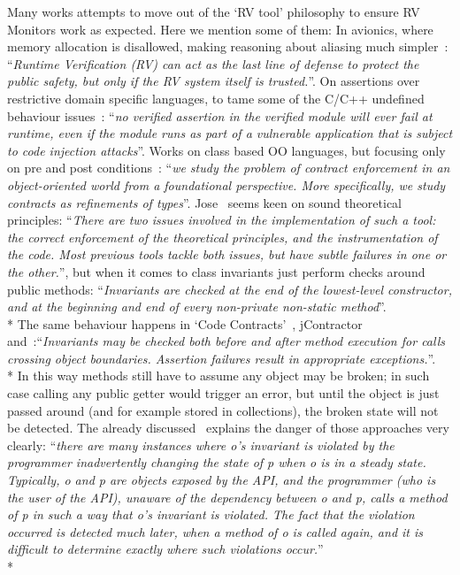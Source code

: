 \noindent Many works attempts to move out of the `RV tool' philosophy to ensure RV Monitors work as expected. Here
we mention some of them:
\sepItems
In avionics, where memory allocation is disallowed, making reasoning about aliasing much simpler~\cite{laurent2015assuring}:
``\emph{Runtime Verification (RV) can act as the last line of defense to
protect the public safety, but only if the RV system itself is trusted.}''.
\sepItems
On assertions over restrictive domain specific languages, to tame some of the C/C++
undefined behaviour issues~\cite{agten2015sound}:
``\emph{no verified assertion in the verified
module will ever fail at runtime, even if the module runs as part of
a vulnerable application that is subject to code injection attacks}''.
\sepItems
Works on class based OO languages, but focusing only on pre and post conditions~\cite{findler2001contract}:
``\emph{we  study  the  problem  of  contract  enforcement in
an object-oriented world from  a foundational perspective.   More
specifically, we study contracts as refinements of types}''.
\sepItems
Jose~\cite{feldman2006jose} seems keen on sound theoretical principles:
``\emph{There are two issues involved
in the implementation of such a tool: the correct enforcement of the theoretical principles, and the instrumentation
of the code. Most previous tools tackle both issues, but have
subtle failures in one or the other.}'',
but when it comes to class invariants just perform checks around public methods:
``\emph{Invariants are checked at the end of the lowest-level constructor,
 and at the beginning and end of every non-private non-static method}''.\\*
The same behaviour happens in `Code Contracts'~\cite{fahndrich2010embedded},
jContractor~\cite{abercrombie2002jcontractor}
and~\cite{tran2003design}:``\emph{Invariants may be checked both before and after
method  execution  for  calls  crossing  object  boundaries.
Assertion  failures  result  in  appropriate  exceptions.}''.\\*
In this way methods still have to assume any object may be broken; in such case calling any
public getter would trigger an error, but until the object is just passed around
(and for example stored in collections), the broken state will not be detected.
The already discussed~\cite{Gopinathan:2008:RMO:1483018.1483028}
explains the danger of those approaches very clearly:
``\emph{there are many instances where o's invariant is violated by the programmer inadvertently changing the state
of p when o is in a steady state. Typically, o and p
are objects exposed by the API, and the programmer (who is the user of the API), unaware of
the dependency between o and p, calls a method of p in such a way that
o's invariant is violated. The fact that the violation occurred is detected
much later, when a method of o is called again, and it is difficult to 
determine exactly where such violations occur.}''\\*
